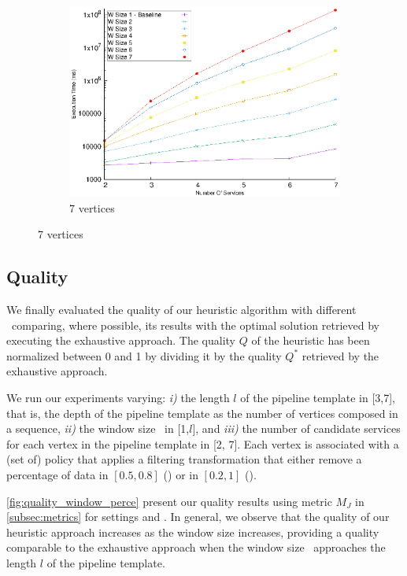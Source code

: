 \begin{figure}[!t]
\begin{subfigure}{0.45\textwidth}
      \includegraphics[width=\textwidth]{Images/graphs/window_time_performance_qualitative_n7_s7_50_80_n7}
      \caption{7 vertices}
      \label{fig:time_window_perce_wide_7n}
    \end{subfigure}
    \label{fig:time_window_perce_average}
  \end{figure}

  \subsection{Quality}\label{subsec:experiments_quality}
  We finally evaluated the quality of our heuristic algorithm with different \windowsize\ comparing, where possible, its results with the optimal solution retrieved by executing the exhaustive approach.
  The quality $Q$ of the heuristic has been normalized between 0 and 1 by dividing it by the quality $Q^*$ retrieved by the exhaustive approach.

  We run our experiments varying: \emph{i)} the length $l$ of the pipeline template in [3,7], that is, the depth of the pipeline template as the number of vertices composed in a sequence, \emph{ii)} the window size \windowsize\ in [1,$l$], and \emph{iii)} the number of candidate services for each vertex in the pipeline template in [2, 7]. Each vertex is associated with a (set of) policy that applies a filtering transformation that either remove a percentage of data in $[0.5,0.8]$ (\average) or in $[0.2,1]$ (\wide).

  \cref{fig:quality_window_perce} present our quality results using metric $M_J$ in \cref{subsec:metrics} for settings \wide and \average.
  In general, we observe that the quality of our heuristic approach increases as the window size increases, providing a quality comparable to the exhaustive approach when the window size \windowsize\ approaches the length $l$ of the pipeline template.

